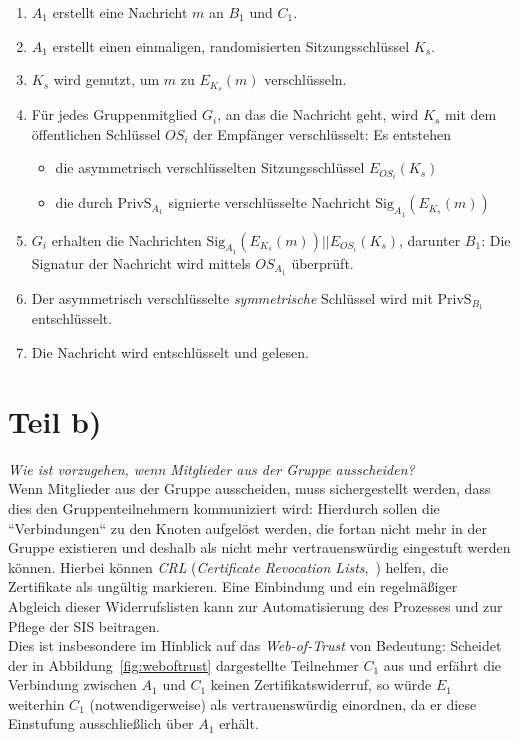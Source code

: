 \begin{enumerate}
    \itemsep0.5em
    \item $A_1$ erstellt eine Nachricht $m$ an $B_1$ und $C_1$.
    \item $A_1$ erstellt einen einmaligen, randomisierten Sitzungsschlüssel $K_s$.
    \item $K_s$ wird genutzt, um $m$ zu $E_{K_s}(m)$ verschlüsseln.
    \item Für jedes Gruppenmitglied $G_i$, an das die Nachricht geht, wird $K_s$ mit dem öffentlichen Schlüssel $OS_i$ der Empfänger verschlüsselt: Es entstehen
    \begin{itemize}
        \item die asymmetrisch verschlüsselten Sitzungsschlüssel $E_{OS_i}(K_s)$
        \item die durch $\text{PrivS}_{A_1}$ signierte verschlüsselte Nachricht $\text{Sig}_{A_1}(E_{K_s}(m))$
    \end{itemize}
    \item $G_i$ erhalten die Nachrichten $\text{Sig}_{A_1}(E_{K_s}(m))||E_{OS_i}(K_s)$, darunter $B_1$: Die Signatur der Nachricht wird mittels $OS_{A_1}$ überprüft.
    \item Der asymmetrisch verschlüsselte \textit{symmetrische} Schlüssel wird mit $\text{PrivS}_{B_1}$ entschlüsselt.
    \item Die Nachricht wird entschlüsselt und gelesen.
\end{enumerate}

\section{Teil b)}

\textit{Wie ist vorzugehen, wenn Mitglieder aus der Gruppe ausscheiden?}\\

\noindent
Wenn Mitglieder aus der Gruppe ausscheiden, muss sichergestellt werden, dass dies den Gruppenteilnehmern kommuniziert wird: Hierdurch sollen die ``Verbindungen`` zu den Knoten aufgelöst werden, die fortan nicht mehr in der Gruppe existieren und deshalb als nicht mehr vertrauenswürdig eingestuft werden können.
Hierbei können \textit{CRL} (\textit{Certificate Revocation Lists},~\cite[34 f.]{ITS6}) helfen, die Zertifikate als ungültig markieren.
Eine Einbindung und ein regelmäßiger Abgleich dieser Widerrufslisten kann zur Automatisierung des Prozesses und zur Pflege der SIS beitragen.\\
Dies ist insbesondere im Hinblick auf das \textit{Web-of-Trust} von Bedeutung: Scheidet der in Abbildung~\ref{fig:weboftrust} dargestellte Teilnehmer $C_1$ aus und erfährt die Verbindung zwischen $A_1$ und $C_1$ keinen Zertifikatswiderruf, so würde $E_1$ weiterhin $C_1$ (notwendigerweise) als vertrauenswürdig einordnen, da er diese Einstufung ausschließlich über $A_1$ erhält.
